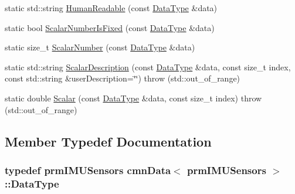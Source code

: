\begin{DoxyCompactItemize}
static std\-::string \hyperlink{classcmn_data_3_01prm_i_m_u_sensors_01_4_a842e65b813b5d0d901950cbb054f446f}{Human\-Readable} (const \hyperlink{classcmn_data_3_01prm_i_m_u_sensors_01_4_a194688d7b45dc5a5b01771de9484c432}{Data\-Type} \&data)
\item 
static bool \hyperlink{classcmn_data_3_01prm_i_m_u_sensors_01_4_af9a19077622d0ae8815de55f733cecc7}{Scalar\-Number\-Is\-Fixed} (const \hyperlink{classcmn_data_3_01prm_i_m_u_sensors_01_4_a194688d7b45dc5a5b01771de9484c432}{Data\-Type} \&data)
\item 
static size\-\_\-t \hyperlink{classcmn_data_3_01prm_i_m_u_sensors_01_4_a8071620fa877d3dee6b6282c6b449901}{Scalar\-Number} (const \hyperlink{classcmn_data_3_01prm_i_m_u_sensors_01_4_a194688d7b45dc5a5b01771de9484c432}{Data\-Type} \&data)
\item 
static std\-::string \hyperlink{classcmn_data_3_01prm_i_m_u_sensors_01_4_a7ac6d308f941e043f26053dbae1eeca7}{Scalar\-Description} (const \hyperlink{classcmn_data_3_01prm_i_m_u_sensors_01_4_a194688d7b45dc5a5b01771de9484c432}{Data\-Type} \&data, const size\-\_\-t index, const std\-::string \&user\-Description=\char`\"{}\char`\"{})  throw (std\-::out\-\_\-of\-\_\-range)
\item 
static double \hyperlink{classcmn_data_3_01prm_i_m_u_sensors_01_4_aa5fe64d57d9a5695a8d568461e78faac}{Scalar} (const \hyperlink{classcmn_data_3_01prm_i_m_u_sensors_01_4_a194688d7b45dc5a5b01771de9484c432}{Data\-Type} \&data, const size\-\_\-t index)  throw (std\-::out\-\_\-of\-\_\-range)
\end{DoxyCompactItemize}


\subsection{Member Typedef Documentation}
\hypertarget{classcmn_data_3_01prm_i_m_u_sensors_01_4_a194688d7b45dc5a5b01771de9484c432}{
\subsubsection[{Data\-Type}]{\setlength{\rightskip}{0pt plus 5cm}typedef {\bf prm\-I\-M\-U\-Sensors} {\bf cmn\-Data}$<$ {\bf prm\-I\-M\-U\-Sensors} $>$\-::{\bf Data\-Type}}}\label{classcmn_data_3_01prm_i_m_u_sensors_01_4_a194688d7b45dc5a5b01771de9484c432}


